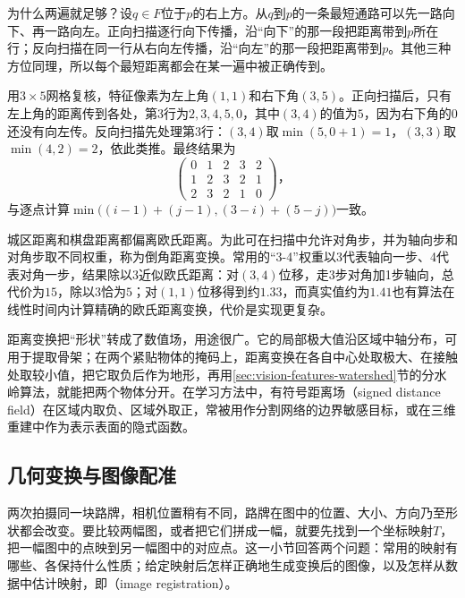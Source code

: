 为什么两遍就足够？设$q\in F$位于$p$的右上方。从$q$到$p$的一条最短通路可以先一路向下、再一路向左。正向扫描逐行向下传播，沿“向下”的那一段把距离带到$p$所在行；反向扫描在同一行从右向左传播，沿“向左”的那一段把距离带到$p$。其他三种方位同理，所以每个最短距离都会在某一遍中被正确传到。

用$3\times5$网格复核，特征像素为左上角$(1,1)$和右下角$(3,5)$。正向扫描后，只有左上角的距离传到各处，第3行为$2,3,4,5,0$，其中$(3,4)$的值为$5$，因为右下角的0还没有向左传。反向扫描先处理第3行：$(3,4)$取$\min(5,0+1)=1$，$(3,3)$取$\min(4,2)=2$，依此类推。最终结果为
\[
  \begin{pmatrix}0&1&2&3&2\\1&2&3&2&1\\2&3&2&1&0\end{pmatrix}\text{，}
\]
与逐点计算$\min\bigl((i-1)+(j-1),(3-i)+(5-j)\bigr)$一致。

城区距离和棋盘距离都偏离欧氏距离。为此可在扫描中允许对角步，并为轴向步和对角步取不同权重，称为倒角距离变换。常用的“3-4”权重以3代表轴向一步、4代表对角一步，结果除以3近似欧氏距离：对$(3,4)$位移，走3步对角加1步轴向，总代价为$15$，除以3恰为$5$；对$(1,1)$位移得到约$1.33$，而真实值约为$1.41$也有算法在线性时间内计算精确的欧氏距离变换，代价是实现更复杂。

距离变换把“形状”转成了数值场，用途很广。它的局部极大值沿区域中轴分布，可用于提取骨架；在两个紧贴物体的掩码上，距离变换在各自中心处取极大、在接触处取较小值，把它取负后作为地形，再用\ref{sec:vision-features-watershed}节的分水岭算法，就能把两个物体分开。在学习方法中，有符号距离场（signed distance field）在区域内取负、区域外取正，常被用作分割网络的边界敏感目标，或在三维重建中作为表示表面的隐式函数。

\subsection{几何变换与图像配准}
\label{sec:vision-formation-geometric-transforms}

两次拍摄同一块路牌，相机位置稍有不同，路牌在图中的位置、大小、方向乃至形状都会改变。要比较两幅图，或者把它们拼成一幅，就要先找到一个坐标映射$T$，把一幅图中的点映到另一幅图中的对应点。这一小节回答两个问题：常用的映射有哪些、各保持什么性质；给定映射后怎样正确地生成变换后的图像，以及怎样从数据中估计映射，即（image registration）。

